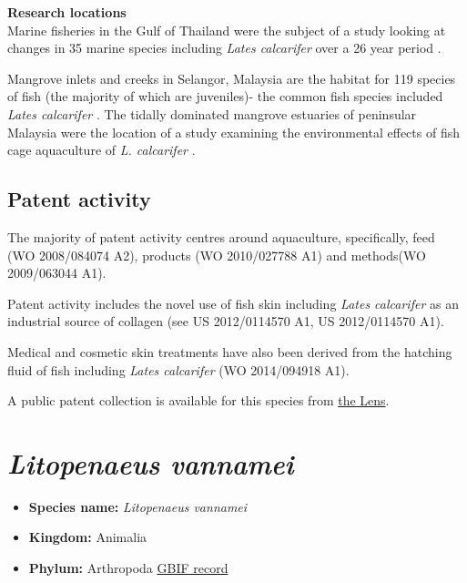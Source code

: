 \documentclass[]{book}
\providecommand{\tightlist}{%
  \setlength{\itemsep}{0pt}\setlength{\parskip}{0pt}}
\theoremstyle{definition}
\theoremstyle{definition}
\theoremstyle{definition}
\theoremstyle{remark}
\begin{document}
\textbf{Research locations}\\
Marine fisheries in the Gulf of Thailand were the subject of a study
looking at changes in 35 marine species including \emph{Lates
calcarifer} over a 26 year period \citep{Tuantong_2015}.

Mangrove inlets and creeks in Selangor, Malaysia are the habitat for 119
species of fish (the majority of which are juveniles)- the common fish
species included \emph{Lates calcarifer} \citep{Sasekumar_1992}. The
tidally dominated mangrove estuaries of peninsular Malaysia were the
location of a study examining the environmental effects of fish cage
aquaculture of \emph{L. calcarifer} \citep{Alongi_2003}.

\hypertarget{patent-activity-1}{%
\subsection{Patent activity}\label{patent-activity-1}}

The majority of patent activity centres around aquaculture,
specifically, feed (WO 2008/084074 A2), products (WO 2010/027788 A1) and
methods(WO 2009/063044 A1).

Patent activity includes the novel use of fish skin including
\emph{Lates calcarifer} as an industrial source of collagen (see US
2012/0114570 A1, US 2012/0114570 A1).

Medical and cosmetic skin treatments have also been derived from the
hatching fluid of fish including \emph{Lates calcarifer} (WO 2014/094918
A1).

A public patent collection is available for this species from
\href{https://www.lens.org/lens/collection/167170}{the Lens}.

\hypertarget{litopenaeus-vannamei}{%
\section{\texorpdfstring{\emph{Litopenaeus
vannamei}}{Litopenaeus vannamei}}\label{litopenaeus-vannamei}}

\begin{itemize}
\tightlist
\item
  \textbf{Species name:} \emph{Litopenaeus vannamei}
\item
  \textbf{Kingdom:} Animalia
\item
  \textbf{Phylum:} Arthropoda
  \href{https://www.gbif.org/species/2223871}{GBIF record}
\end{itemize}
\end{document}
